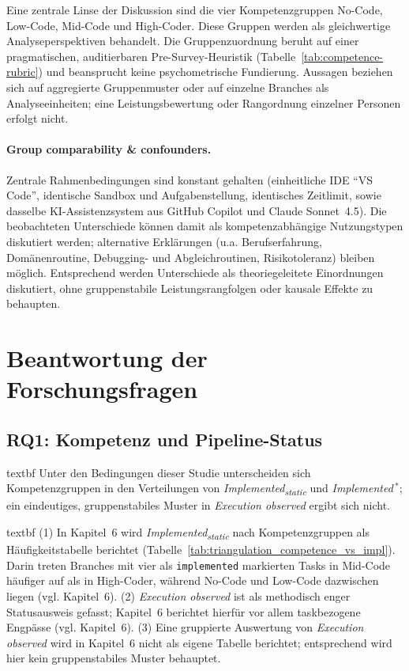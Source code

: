 Eine zentrale Linse der Diskussion sind die vier Kompetenzgruppen No-Code, Low-Code, Mid-Code und High-Coder.
Diese Gruppen werden als gleichwertige Analyseperspektiven behandelt.
Die Gruppenzuordnung beruht auf einer pragmatischen, auditierbaren Pre-Survey-Heuristik (Tabelle~\ref{tab:competence-rubric}) und beansprucht keine psychometrische Fundierung.
Aussagen beziehen sich auf aggregierte Gruppenmuster oder auf einzelne Branches als Analyseeinheiten; eine Leistungsbewertung oder Rangordnung einzelner Personen erfolgt nicht.

\paragraph{Group comparability \& confounders.}
Zentrale Rahmenbedingungen sind konstant gehalten (einheitliche IDE \enquote{VS Code}, identische Sandbox und Aufgabenstellung, identisches Zeitlimit, sowie dasselbe KI-Assistenzsystem aus GitHub Copilot und Claude Sonnet~4.5).
Die beobachteten Unterschiede k\"onnen damit als kompetenzabh\"angige Nutzungstypen diskutiert werden; alternative Erkl\"arungen (u.a. Berufserfahrung, Dom\"anenroutine, Debugging- und Abgleichroutinen, Risikotoleranz) bleiben m\"oglich.
Entsprechend werden Unterschiede als theoriegeleitete Einordnungen diskutiert, ohne gruppenstabile Leistungsrangfolgen oder kausale Effekte zu behaupten.

\section{Beantwortung der Forschungsfragen}
\label{sec:discussion_rq_answers}

\subsection*{RQ1: Kompetenz und Pipeline-Status}
	\csname textbf Unter den Bedingungen dieser Studie unterscheiden sich Kompetenzgruppen in den Verteilungen von \textit{Implemented\textsubscript{static}} und \textit{Implemented}\,$^\ast$; ein eindeutiges, gruppenstabiles Muster in \textit{Execution observed} ergibt sich nicht.

	\csname textbf (1) In Kapitel~6 wird \textit{Implemented\textsubscript{static}} nach Kompetenzgruppen als H\"aufigkeitstabelle berichtet (Tabelle~\ref{tab:triangulation_competence_vs_impl}). Darin treten Branches mit vier als \texttt{implemented} markierten Tasks in Mid-Code h\"aufiger auf als in High-Coder, w\"ahrend No-Code und Low-Code dazwischen liegen (vgl. Kapitel~6). (2) \textit{Execution observed} ist als methodisch enger Statusausweis gefasst; Kapitel~6 berichtet hierf\"ur vor allem taskbezogene Engp\"asse (vgl. Kapitel~6). (3) Eine gruppierte Auswertung von \textit{Execution observed} wird in Kapitel~6 nicht als eigene Tabelle berichtet; entsprechend wird hier kein gruppenstabiles Muster behauptet.

